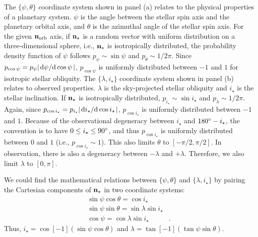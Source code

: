\documentclass[twocolumn,times]{aastex631}
\begin{document}
The $\{\psi, \theta\}$ coordinate system shown in panel (a) relates to the physical properties of a planetary system. $\psi$ is the angle between the stellar spin axis and the planetary orbital axis, and $\theta$ is the azimuthal angle of the stellar spin axis. For the given $\bf{n}_{\rm orb}$ axis, if $\bf{n}_{\star}$ is a random vector with uniform distribution on a three-dimensional sphere, i.e., $\bf{n}_{\star}$ is isotropically distributed, the probability density function of $\psi$ follows $p_{\psi} \sim \sin{\psi}$ and $p_\theta \sim 1/2\pi$. Since $p_{\cos{\psi}} = p_{\psi} \abs{\dv*{\psi}{\cos{\psi}}}$, $p_{\cos{\psi}}$ is uniformly distributed between $-1$ and $1$ for isotropic stellar obliquity.
The $\{\lambda, i_\star\}$ coordinate system shown in panel (b) relates to observed properties. $\lambda$ is the sky-projected stellar obliquity and $i_\star$ is the stellar inclination. If $\bf{n}_{\star}$ is isotropically distributed, $p_{i_\star} \sim \sin{i_\star}$ and $p_\lambda \sim 1/2\pi$. Again, since $p_{\cos{i_\star}} = p_{i_\star} \abs{\dv*{i_\star}{\cos{i_\star}}}$, $p_{\cos{i_\star}}$ is uniformly distributed between $-1$ and $1$. Because of the observational degeneracy between $i_\star$ and $180\mbox{$^\circ$} - i_\star$, the convention is to have $0 \leq i_\star \leq 90\mbox{$^\circ$}$, and thus $p_{\cos{i_\star}}$ is uniformly distributed between $0$ and $1$ (i.e., $p_{\cos{i_\star}} \sim 1$). This also limits $\theta$ to $[-\pi/2, \pi/2]$. 
In observation, there is also a degeneracy between $-\lambda$ and $+\lambda$. Therefore, we also limit $\lambda$ to $[0,\pi]$.

We could find the mathematical relations between $\{\psi, \theta\}$ and $\{\lambda, i_\star\}$ by pairing the Cartesian components of $\bf{n}_{\star}$ in two coordinate systems:
\begin{align}
    \sin{\psi}\cos{\theta} = \cos{i_\star}& \label{eq:coord1}\\
    \sin{\psi}\sin{\theta} = \sin{\lambda}\sin{i_\star}& \label{eq:coord2}\\
    \cos{\psi} = \cos{\lambda}\sin{i_\star} \label{eq:coord3}&.
\end{align}
Thus, $i_\star = \cos[-1](\sin{\psi}\cos{\theta})$ and $\lambda = \tan[-1](\tan{\psi}\sin{\theta})$. 
\end{document}

